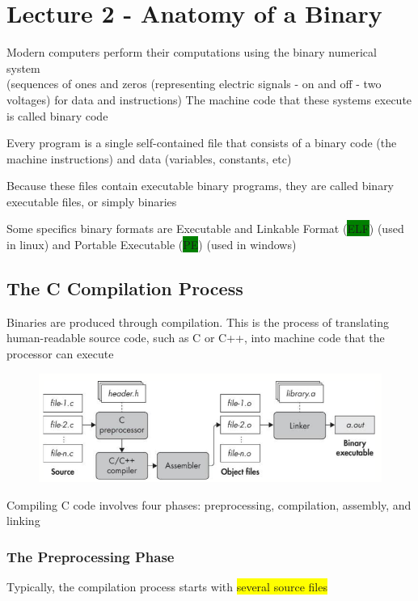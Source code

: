 \documentclass[]{project_plan}
\begin{document}
\chapter{Lecture 2 - Anatomy of a Binary}

Modern computers perform their computations using the binary numerical system\\
(sequences of ones and zeros (representing electric signals - on and off - two voltages) for data and instructions)
The machine code that these systems execute is called binary code

Every program is a single self-contained file that consists of a binary code
(the machine instructions) and data (variables, constants, etc)

Because these files contain executable binary programs, they are called binary
executable files, or simply binaries

Some specifics binary formats are Executable and Linkable Format (\colorbox{green}{ELF}) (used in linux) and Portable
Executable (\colorbox{green}{PE}) (used in windows)

\section{The C Compilation Process}

Binaries are produced through compilation. This is the process of translating human-readable
source code, such as C or C++, into machine code that the processor can execute

\begin{figure}[H]
  \centering
  \includegraphics[width=.8\linewidth]{c_compilation.png}
\end{figure}

Compiling C code involves four phases: preprocessing, compilation, assembly, and linking

\subsection{The Preprocessing Phase}

Typically, the compilation process starts with \colorbox{yellow}{several source files}
\end{document}
